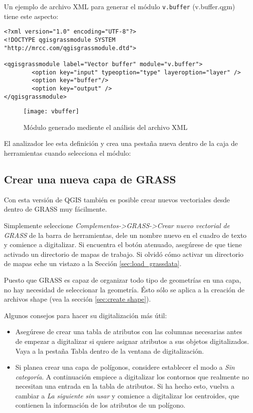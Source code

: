 Un ejemplo de archivo XML para generar el módulo \texttt{v.buffer} (v.buffer.qgm) tiene este aspecto:
\begin{verbatim}
<?xml version="1.0" encoding="UTF-8"?>
<!DOCTYPE qgisgrassmodule SYSTEM "http://mrcc.com/qgisgrassmodule.dtd">

<qgisgrassmodule label="Vector buffer" module="v.buffer">
        <option key="input" typeoption="type" layeroption="layer" />
        <option key="buffer"/>
        <option key="output" />
</qgisgrassmodule>
\end{verbatim}

\begin{figure}[ht]
\centering
\caption{Módulo generado mediente el análisis del archivo XML}\label{fig:buffer-module}
\texttt{[image: vbuffer]}
\end{figure}

El analizador lee esta definición y crea una pestaña nueva dentro de la caja de herramientas cuando selecciona el módulo:


\subsection{Crear una nueva capa de GRASS}\label{sec:creating_new_grass_vectors}

Con esta versión de QGIS también es posible crear nuevos vectoriales desde dentro de GRASS muy fácilmente.

Simplemente seleccione \textsl{Complementos->GRASS->Crear nuevo vectorial de GRASS} de la barra de herramientas, dele un nombre nuevo en el cuadro de texto y comience a digitalizar. Si encuentra el botón atenuado, asegúrese de que tiene activado un directorio de mapas de trabajo. Si olvidó cómo activar un directorio de mapas eche un vistazo a la Sección \ref{sec:load_grassdata}.

Puesto que GRASS es capaz de organizar todo tipo de geometrías en una capa, no hay necesidad de seleccionar la geometría. Ésto sólo se aplica a la creación de archivos shape (vea la sección \ref{sec:create shape}).

Algunos consejos para hacer su digitalización más útil:
\begin{itemize}
\item Asegúrese de crear una tabla de atributos con las columnas necesarias antes de empezar a digitalizar si quiere asignar atributos a sus objetos digitalizados. Vaya a la pestaña Tabla dentro de la ventana de digitalización.
\item Si planea crear una capa de polígonos, considere establecer el modo a \textsl{Sin categoría}. A continuación empiece a digitalizar los contornos que realmente no necesitan una entrada en la tabla de atributos. Si ha hecho esto, vuelva a cambiar a \textsl{La siguiente sin usar} y comience a digitalizar los centroides, que contienen la información de los atributos de un polígono.

\end{itemize}

